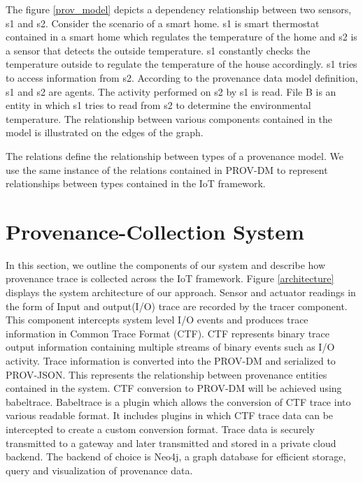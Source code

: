 The figure \ref{prov_model}  depicts a dependency relationship between two sensors, s1 and s2. Consider the scenario of a smart home. s1 is smart thermostat contained in a smart home which regulates the temperature of the home and s2 is a sensor that detects the outside temperature. s1 constantly checks the temperature outside to regulate the temperature of the house accordingly. s1 tries to access information from s2. According to the provenance data model  definition, s1 and s2 are agents. The activity performed on s2 by s1 is read. File B is an entity in which s1 tries to read from s2 to determine the environmental temperature. The relationship between various components contained in the model is illustrated on the edges of the graph.

\par The relations define the relationship between types of a provenance model. We use the same instance of the relations contained in PROV-DM to represent relationships between types contained in the IoT framework.




\section{Provenance-Collection System}

In this section, we outline the components of our system and describe how provenance trace is collected across the IoT framework. Figure \ref{architecture} displays the system architecture of our approach. Sensor and actuator readings in the form of Input and output(I/O) trace are recorded by the tracer component. This component intercepts system level I/O events and produces trace information in Common Trace Format (CTF). CTF represents binary trace output information containing multiple streams of binary events such as I/O activity. Trace information is converted into the PROV-DM and serialized to PROV-JSON. This represents the relationship between provenance entities contained in the system. CTF conversion to PROV-DM will be achieved using babeltrace. Babeltrace is a plugin which allows the conversion of CTF trace into various readable format. It includes plugins in which CTF trace data can be intercepted to create a custom conversion format. Trace data is securely transmitted to a gateway and later transmitted and stored in a private cloud backend. The backend of choice is Neo4j, a graph database for efficient storage, query and visualization of provenance data.



